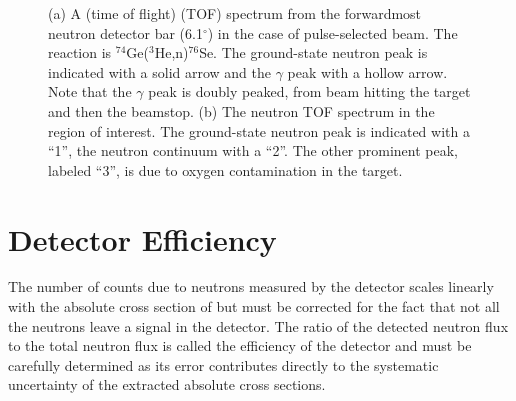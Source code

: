 \begin{figure}[!htbp]
\centering
{}
\caption[Timing spectrum due to $^{74}$Ge($^3$He,n)$^{76}$Se.]{(a) A (time of flight) (TOF) spectrum from the forwardmost neutron detector bar (6.1$^{\circ}$) in the case of pulse-selected beam.  The reaction is $^{74}$Ge($^3$He,n)$^{76}$Se.  The ground-state neutron peak is indicated with a solid arrow and the $\gamma$ peak with a hollow arrow.  Note that the $\gamma$ peak is doubly peaked, from beam hitting the target and then the beamstop.  (b) The neutron TOF spectrum in the region of interest.  The ground-state neutron peak is indicated with a ``1'', the neutron continuum with a ``2''.  The other prominent peak, labeled ``3'', is due to oxygen contamination in the target.}
\label{fig:time}
\end{figure}


\section{Detector Efficiency}

\label{sec:efficiency}
The number of counts due to neutrons measured by the detector scales linearly with the absolute cross section of \reaction but must be corrected for the fact that not all the neutrons leave a signal in the detector.  The ratio of the detected neutron flux to the total neutron flux is called the efficiency of the detector and must be carefully determined as its error contributes directly to the systematic uncertainty of the extracted absolute cross sections.

